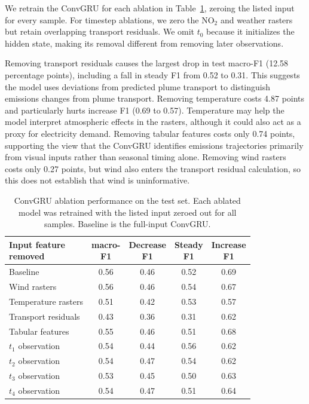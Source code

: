 \documentclass[sigconf,nonacm]{acmart}
\begin{document}
We retrain the ConvGRU for each ablation in Table~\ref{tab:ablation-study},
zeroing the listed input for every sample. For timestep ablations, we zero the
NO$_2$ and weather rasters but retain overlapping transport residuals. We omit
$t_0$ because it initializes the hidden state, making its removal different
from removing later observations.

Removing transport residuals causes the largest drop in test macro-F1 (12.58
percentage points), including a fall in steady F1 from 0.52 to 0.31. This
suggests the model uses deviations from predicted plume transport to
distinguish emissions changes from plume transport. Removing temperature costs
4.87 points and particularly hurts increase F1 (0.69 to 0.57). Temperature may
help the model interpret atmospheric effects in the rasters, although it could
also act as a proxy for electricity demand. Removing tabular features costs
only 0.74 points, supporting the view that the ConvGRU identifies emissions
trajectories primarily from visual inputs rather than seasonal timing alone.
Removing wind rasters costs only 0.27 points, but wind also enters the transport
residual calculation, so this does not establish that wind is uninformative.

\begin{table}[t]
  \caption{ConvGRU ablation performance on the test set. Each ablated model was
  retrained with the listed input zeroed out for all samples. Baseline is the
  full-input ConvGRU.}
  \label{tab:ablation-study}
  \centering
  \small
  \setlength{\tabcolsep}{3pt}
  \begin{tabular}{@{}lcccc@{}}
    \toprule
    \shortstack[l]{Input feature\\removed} &
    \shortstack{macro-\\F1} &
    \shortstack{Decrease\\F1} &
    \shortstack{Steady\\F1} &
    \shortstack{Increase\\F1} \\
    \midrule
    Baseline                   & 0.56 & 0.46 & 0.52 & 0.69 \\
    Wind rasters               & 0.56 & 0.46 & 0.54 & 0.67 \\
    Temperature rasters        & 0.51 & 0.42 & 0.53 & 0.57 \\
    Transport residuals        & 0.43 & 0.36 & 0.31 & 0.62 \\
    Tabular features           & 0.55 & 0.46 & 0.51 & 0.68 \\
    \addlinespace
    $t_1$ observation          & 0.54 & 0.44 & 0.56 & 0.62 \\
    $t_2$ observation          & 0.54 & 0.47 & 0.54 & 0.62 \\
    $t_3$ observation          & 0.53 & 0.45 & 0.50 & 0.63 \\
    $t_4$ observation          & 0.54 & 0.47 & 0.51 & 0.64 \\
    \bottomrule
  \end{tabular}
\end{table}
\end{document}
